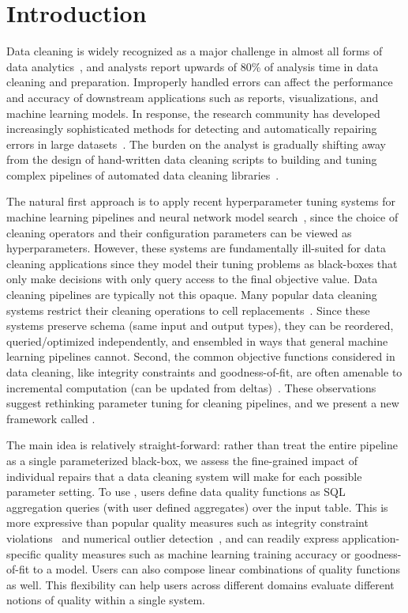 \section{Introduction}\label{intro}\sloppy
Data cleaning is widely recognized as a major challenge in almost all forms of data analytics~\cite{nytimes}, and analysts report upwards of 80\% of analysis time in data cleaning and preparation.
Improperly handled errors can affect the performance and accuracy of downstream applications such as reports, visualizations, and machine learning models.
In response, the research community has developed increasingly sophisticated methods for detecting and automatically repairing errors in large datasets~\cite{dc, rekatsinas2017holoclean, DBLP:journals/pvldb/KrishnanWWFG16, DBLP:conf/sigmod/ChuIKW16, mudgal2018deep, doan2018toward}.
The burden on the analyst is gradually shifting away from the design of hand-written data cleaning scripts to building and tuning complex pipelines of automated data cleaning libraries~\cite{krishnan2016hilda}.

The natural first approach is to apply recent hyperparameter tuning systems for machine learning pipelines and neural network model search~\cite{li2017hyperband, sparks2017keystoneml, baylor2017tfx, golovin2017google, liaw2018tune}, since the choice of cleaning operators and their configuration parameters can be viewed as hyperparameters.
However, these systems are fundamentally ill-suited for data cleaning applications since they model their tuning problems as black-boxes that only make decisions with only query access to the final objective value.
Data cleaning pipelines are typically not this opaque.
Many popular data cleaning systems restrict their cleaning operations to cell replacements~\cite{rekatsinas2017holoclean,DBLP:conf/sigmod/ChuIKW16, DBLP:journals/pvldb/KrishnanWWFG16}.
Since these systems preserve schema (same input and output types), they can be reordered, queried/optimized independently, and ensembled in ways that general machine learning pipelines cannot.
Second, the common objective functions considered in data cleaning, like integrity constraints and goodness-of-fit, are often amenable to incremental computation (can be updated from deltas)~\cite{fan2014incremental}.
These observations suggest rethinking parameter tuning for cleaning pipelines, and we present a new framework called \sys.

The main idea is relatively straight-forward: rather than treat the entire pipeline as a single parameterized black-box, we assess the fine-grained impact of individual repairs that a data cleaning system will make for each possible parameter setting.
To use \sys, users define data quality functions as SQL aggregation queries (with user defined aggregates) over the input table.  This is more expressive than popular quality measures such as integrity constraint violations~\cite{ilyas2015trends} and numerical outlier detection~\cite{bailis2017macrobase}, and can readily express application-specific quality measures such as machine learning training accuracy or goodness-of-fit to a model.  Users can also compose linear combinations of quality functions as well.  This flexibility can help users across different domains evaluate different notions of quality within a single system.

